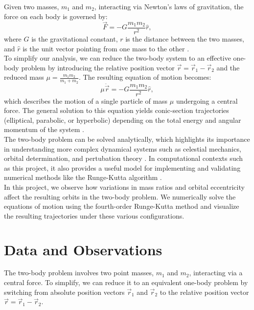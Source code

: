 \documentclass[linenumbers, twocolumn]{aastex631}
\begin{document}
\noindent Given two masses, $m_1$ and $m_2$, interacting via Newton's laws of
gravitation, the force on each body is governed by:
\begin{equation}
    \vec{F}=-G\frac{m_1m_2}{r^2}\hat{r},
\end{equation}
\noindent where $G$ is the gravitational constant, $r$ is the distance between
the two masses, and $\hat{r}$ is the unit vector pointing from one mass to the other
\cite{taylor}.\\

\noindent To simplify our analysis, we can reduce the two-body system to an 
effective one-body problem by introducing the relative position vector
$\vec{r}=\vec{r}_1-\vec{r}_2$ and the reduced mass $\mu=\frac{m_1m_2}{m_1+m_2}$.
The resulting equation of motion becomes:
\begin{equation}
    \mu\ddot{\vec{r}}=-G\frac{m_1m_2}{r^2}\hat{r},
\end{equation}
\noindent which describes the motion of a single particle of mass $\mu$ undergoing
a central force. The general solution to this equation yields conic-section
trajectories (elliptical, parabolic, or hyperbolic) depending on the total energy
and angular momentum of the system \cite{taylor}.\\

\noindent The two-body problem can be solved analytically, which highlights
its importance in understanding more complex dynamical systems such as
celestial mechanics, orbital determination, and pertubation theory \cite{meyer, schneider}. In 
computational contexts such as this project, it also provides a useful model
for implementing and validating numerical methods like the Runge-Kutta
algorithm \cite{sullivan}.\\

\noindent In this project, we observe how variations in mass ratios and orbital
eccentricity affect the resulting orbits in the two-body problem. We numerically
solve the equations of motion using the fourth-order Runge-Kutta method and
visualize the resulting trajectories under these various configurations.\\

\section{Data and Observations} \label{sec:data}

The two-body problem involves two point masses, $m_1$ and $m_2$, interacting via
a central force. To simplify, we can reduce it to an equivalent one-body problem
by switching from absolute position vectors $\vec{r}_1$ and $\vec{r}_2$ to the
relative position vector $\vec{r}=\vec{r}_1-\vec{r}_2$.\\
\end{document}
